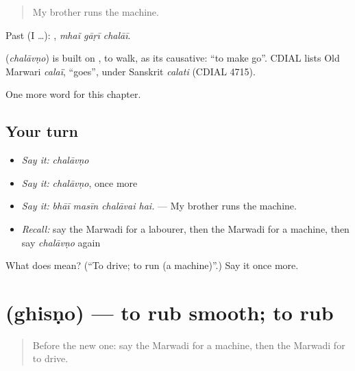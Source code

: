 \begin{quote}
My brother runs the machine.
\end{quote}

Past (I …):   , \emph{mhaĩ gāṛī chalāī}.

\begin{cousinweb}
\textbf{} (\emph{chalāvṇo}) is built on \textbf{}, to walk, as its causative: \textquotedblleft{}to make go\textquotedblright{}. CDIAL lists Old Marwari \emph{calaï}, \textquotedblleft{}goes\textquotedblright{}, under Sanskrit \emph{calati} (CDIAL 4715).
\end{cousinweb}

\begin{grammarlens}[title={What you've built}]
One more word for this chapter.
\end{grammarlens}

\subsection*{Your turn}
\begin{itemize}
\raggedright
  \item \emph{Say it:} \emph{chalāvṇo}
  \item \emph{Say it:} \emph{chalāvṇo}, once more
  \item \emph{Say it:} \emph{bhāī masīn chalāvai hai.} — My brother runs the machine.
  \item \emph{Recall:} say the Marwadi for a labourer, then the Marwadi for a machine, then say \emph{chalāvṇo} again
\end{itemize}

\begin{tcolorbox}[breakable,colback=teal!4,colframe=teal!35!black,title={Before you move on}]
What does  mean? (\textquotedblleft{}To drive; to run (a machine)\textquotedblright{}.) Say it once more.
\end{tcolorbox}
\section[\texorpdfstring{\mw{घिसणो} (ghisṇo)}{घिसणो (ghisṇo)}]{ (ghisṇo) — to rub smooth; to rub}

\label{lesson:MW-C289-ghisno}



\begin{quote}
Before the new one: say the Marwadi for a machine, then the Marwadi for to drive.
\end{quote}

